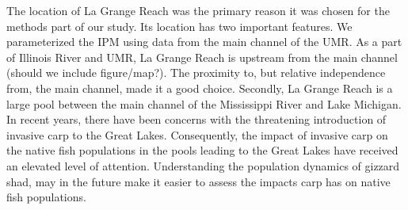 \documentclass[preprint,review,12pt,authoryear]{elsarticle}
\begin{document}
The location of La Grange Reach was the primary reason it was chosen for the methods part of our study.  Its location has two important features. We parameterized the IPM using data from the main channel of the UMR.  As a part of Illinois River and UMR, La Grange Reach is upstream from the main channel (should we include figure/map?).  The proximity to, but relative independence from, the main channel, made it a good choice.  Secondly, La Grange Reach is a large pool between the main channel of the Mississippi River and Lake Michigan.  In recent years, there have been concerns with the threatening introduction of invasive carp to the Great Lakes.  Consequently, the impact of invasive carp on the native fish populations in the pools leading to the Great Lakes have received an elevated level of attention.  Understanding the population dynamics of gizzard shad, may in the future make it easier to assess the impacts carp has on native fish populations.
\end{document}
